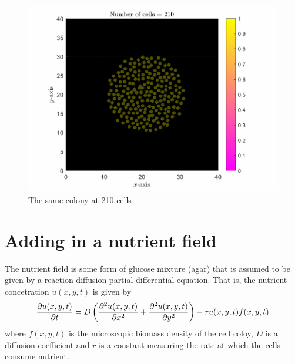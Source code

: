 \begin{figure}[h]
\centering
\includegraphics[width=1\textwidth]{chapter1/figures/ColonySimulationDemo_N_210.pdf}
\caption{The same colony at 210 cells}
\label{fig:ColonySimulationN210}
\end{figure}
\filbreak

\section{Adding in a nutrient field}
The nutrient field is some form of glucose mixture (agar) that is assumed to be given by a reaction-diffusion 
partial differential equation. That is, the nutrient concetration $u(x,y,t)$ is given by
\begin{equation}
    \pdv{u(x,y,t)}{t} = D \left( \frac{\partial^2 u(x,y,t)}{\partial x^2} + 
                          \frac{\partial^2 u(x,y,t)}{\partial y^2} \right) - r u(x,y,t) f(x,y,t)
\end{equation}
where $f(x,y,t)$ is the microscopic biomass density of the cell coloy, $D$ is a diffusion
coefficient and $r$ is a constant measuring the rate at which the cells consume nutrient.

